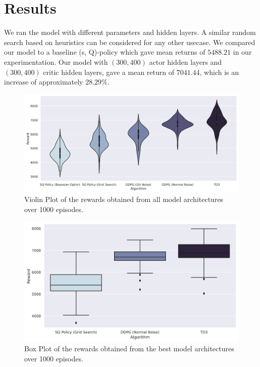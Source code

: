 \documentclass{article}
\begin{document}
\pagebreak

\section{Results}
We ran the model with different parameters and hidden layers. A similar random search based on heuristics can be considered for any other usecase. We compared our model to a baseline (s, Q)-policy which gave mean returns of $5488.21$ in our experimentation. Our model with $(300, 400)$ actor hidden layers and $(300, 400)$ critic hidden layers, gave a mean return of $7041.44$, which is an increase of approximately $28.29\%$.

\begin{figure}[h!]
    \centering
    \includegraphics[width=\textwidth]{rewardviolinplot.png}
    \caption{Violin Plot of the rewards obtained from all model architectures over 1000 episodes.}
\end{figure}

\begin{figure}[h!]
    \centering
    \includegraphics[width=\textwidth]{rewardboxplot.png}
    \caption{Box Plot of the rewards obtained from the best model architectures over 1000 episodes.}
\end{figure}
\end{document}
